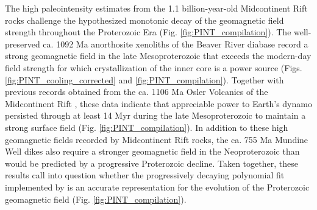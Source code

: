 The high paleointensity estimates from the 1.1 billion-year-old Midcontinent Rift rocks challenge the hypothesized monotonic decay of the geomagnetic field strength throughout the Proterozoic Era (Fig. \ref{fig:PINT_compilation}). The well-preserved ca. 1092 Ma anorthosite xenoliths of the Beaver River diabase record a strong geomagnetic field in the late Mesoproterozoic that exceeds the modern-day field strength for which crystallization of the inner core is a power source (Figs. \ref{fig:PINT_cooling_corrected} and \ref{fig:PINT_compilation}). Together with previous records obtained from the ca. 1106 Ma Osler Volcanics of the Midcontinent Rift \citep{Sprain2018a}, these data indicate that appreciable power to Earth's dynamo persisted through at least 14 Myr during the late Mesoproterozoic to maintain a strong surface field (Fig. \ref{fig:PINT_compilation}). In addition to these high geomagnetic fields recorded by Midcontinent Rift rocks, the ca. 755 Ma Mundine Well dikes \citep{Lloyd2021b} also require a stronger geomagnetic field in the Neoproterozoic than would be predicted by a progressive Proterozoic decline. Taken together, these results call into question whether the progressively decaying polynomial fit implemented by \citep{Bono2019a} is an accurate representation for the evolution of the Proterozoic geomagnetic field (Fig. \ref{fig:PINT_compilation}). 

